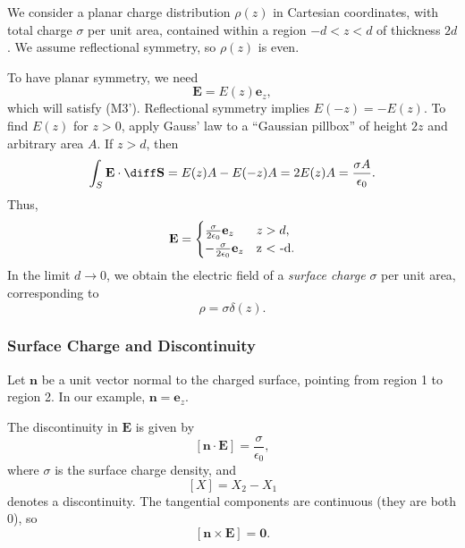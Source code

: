 \documentclass[12pt]{article}
\begin{document}
We consider a planar charge distribution $\rho(z)$ in Cartesian coordinates, with total charge $\sigma$ per unit area, contained within a region $-d < z < d$ of thickness $2d$. We assume reflectional symmetry, so $\rho(z)$ is even.

To have planar symmetry, we need
\[
\mathbf{E} = E(z) \mathbf{e}_z
,\]
which will satisfy (M3'). Reflectional symmetry implies $E(-z) = -E(z)$. To find $E(z)$ for $z > 0$, apply Gauss' law to a ``Gaussian pillbox'' of height $2z$ and arbitrary area $A$. If $z > d$, then
\[
\int_{S}\mathbf{E} \cdot \diff \mathbf{S} = E(z)A - E(-z)A = 2E(z)A = \frac{\sigma A}{\epsilon_0}
.\]
Thus,
\[
\mathbf{E} =
\begin{cases}
	\frac{\sigma}{2 \epsilon_0} \mathbf{e}_z & z > d, \\
	-\frac{\sigma}{2 \epsilon_0} \mathbf{e}_z & $z < -d$.
\end{cases}
\]
In the limit $d \to 0$, we obtain the electric field of a \emph{surface charge} $\sigma$ per unit area, corresponding to
\[
\rho = \sigma \delta(z)
.\]

\subsubsection{Surface Charge and Discontinuity}
\label{subsub:surface_charge_and_discontinuity}

Let $\mathbf{n}$ be a unit vector normal to the charged surface, pointing from region 1 to region 2. In our example, $\mathbf{n} = \mathbf{e}_z$.

The discontinuity in $\mathbf{E}$ is given by
\[
	[\mathbf{n} \cdot \mathbf{E}] = \frac{\sigma}{\epsilon_0}
,\]
where $\sigma$ is the surface charge density, and
\[
	[X] = X_2 - X_1
\]
denotes a discontinuity. The tangential components are continuous (they are both 0), so
\[
	[\mathbf{n} \times \mathbf{E}] = \mathbf{0}
.\]

\newpage

\printindex
\end{document}
